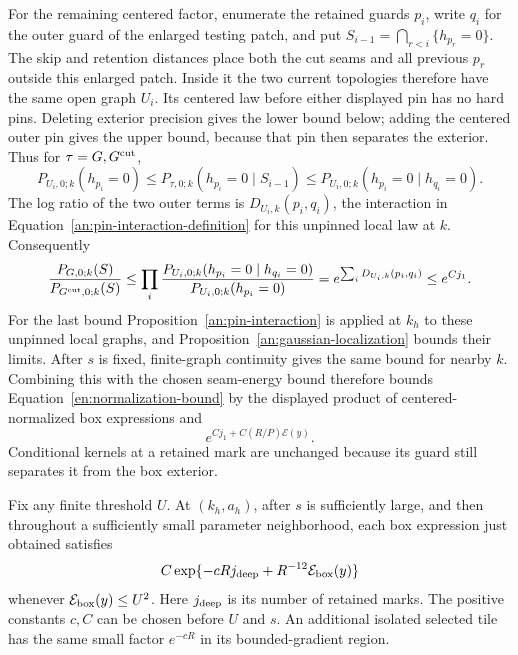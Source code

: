 For the remaining centered factor, enumerate the retained guards
$p_i$, write $q_i$ for the outer guard of the enlarged testing patch,
and put $S_{i-1}=\bigcap_{r<i}\{h_{p_r}=0\}$.  The skip and retention
distances place both the cut seams and all previous $p_r$ outside
this enlarged patch.  Inside it the two current topologies therefore
have the same open graph $U_i$.  Its centered law before either
displayed pin has no hard pins.  Deleting exterior precision gives
the lower bound below; adding the centered outer pin gives the upper
bound, because that pin then separates the exterior.  Thus for
$\tau=G,G^{\rm cut}$,
\[
 P_{U_i,0;k}(h_{p_i}=0)
 \le P_{\tau,0;k}(h_{p_i}=0\mid S_{i-1})
 \le P_{U_i,0;k}(h_{p_i}=0\mid h_{q_i}=0).
\]
The log ratio of the two outer terms is
$D_{U_i,k}(p_i,q_i)$, the interaction in
Equation~\eqref{an:pin-interaction-definition} for this unpinned
local law at $k$.  Consequently
\[
 \frac{P_{G,0;k}(S)}{P_{G^{\rm cut},0;k}(S)}
 \le \prod_i
 \frac{P_{U_i,0;k}(h_{p_i}=0\mid h_{q_i}=0)}
      {P_{U_i,0;k}(h_{p_i}=0)}
 =e^{\sum_iD_{U_i,k}(p_i,q_i)}
 \le e^{Cj_1}.
\]
For the last bound Proposition~\ref{an:pin-interaction} is applied
at $k_h$ to these unpinned local graphs, and
Proposition~\ref{an:gaussian-localization} bounds their limits.
After $s$ is fixed, finite-graph continuity gives the same bound
for nearby $k$.  Combining this with the chosen seam-energy bound
therefore bounds Equation~\eqref{en:normalization-bound} by the
displayed product of centered-normalized box expressions and
\begin{equation}\label{en:seam-cost}
                     e^{Cj_1+C(R/P)\mathcal E(y)}.
\end{equation}
Conditional kernels at a retained mark are unchanged because its
guard still separates it from the box exterior.

\begin{lemma}\label{en:good-box}
Fix any finite threshold $U$.  At $(k_h,a_h)$, after $s$ is sufficiently
large, and then throughout a sufficiently small parameter neighborhood,
each box expression just obtained satisfies
\begin{equation}\label{en:good-box-bound}
 C\exp\{-cRj_{\rm deep}+R^{-12}\mathcal E_{\rm box}(y)\}
\end{equation}
whenever $\mathcal E_{\rm box}(y)\leq U^2$.  Here $j_{\rm deep}$ is
its number of retained marks.  The positive constants $c,C$ can be
chosen before $U$ and $s$.  An additional isolated selected tile has
the same small factor $e^{-cR}$ in its bounded-gradient region.
\end{lemma}

